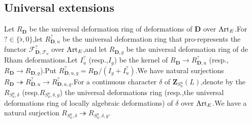\documentclass[10pt]{article}
\newcommand{\Art}{{\rm Art}}
\newcommand{\Dpik}{{\mathbf{D}}}
\newcommand{\bZ}{{\mathbf{Z}}}
\newcommand{\cF}{\mathcal F}
\begin{document}
\subsection{Universal extensions}\label{sectionforunverext}

Let $R_{\Dpik}$ be the universal deformation ring of deformations of $\Dpik$ over $\Art_E$.\;For $?\in\{\flat,0\}$,\;let $R^{?}_{\Dpik,u}$ be the universal deformation ring that pro-represents the functor $\cF_{\Dpik,\cF_u}^{?}$ over $\Art_E$,\;and let $R_{\Dpik,g}$ be the universal deformation ring of de Rham deformations.\;Let $I^{?}_u$ (resp.,\;$I_{g}$) be the kernel of $R_{\Dpik}\rightarrow R^{?}_{\Dpik,u}$ (resp.,\;$R_{\Dpik}\rightarrow R_{\Dpik,g}$).\;Put $R^{?}_{\Dpik,u,g}=R_{\Dpik}/(I_g+I^{?}_u)$.\;We have natural surjections $R_{\Dpik}\twoheadrightarrow R^{?}_{\Dpik,u}\rightarrow  R^{?}_{\Dpik,u,g}$.\;For a continuous character $\delta$ of $\bZ_{S^u_0}(L)$,\;denote by the $R_{S_0^u,\delta}$ (resp.\;$R_{S_0^u,\delta,g}$) the universal deformations ring (resp.,\;the universal deformations ring of locally algebraic deformations) of $\delta$ over $\Art_E$.\;We have  a natural surjection $R_{S_0^u,\delta}\twoheadrightarrow R_{S_0^u,\delta,g}$.\;
\end{document}
